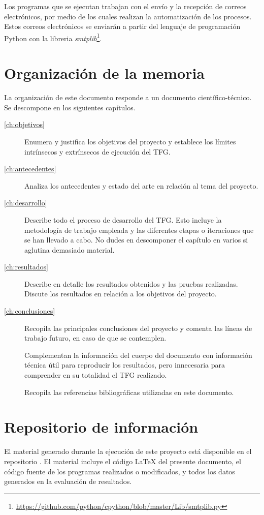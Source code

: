 Los programas que se ejecutan trabajan con el envío y la recepción de correos electrónicos, por medio de los cuales realizan la automatización de los procesos. Estos correos electrónicos se enviarán a partir del lenguaje de programación Python con la libreria \emph{smtplib}\footnote{\url{https://github.com/python/cpython/blob/master/Lib/smtplib.py}}.

\section{Organización de la memoria} 
\label{sec:organizacion-memoria}

\noindent La organización de este documento responde a un documento científico-técnico. Se descompone en los siguientes capítulos.

\begin{description}
    \item[\autoref{ch:objetivos}] Enumera y justifica los objetivos del proyecto y establece los límites intrínsecos y extrínsecos de ejecución del TFG.
    \item[\autoref{ch:antecedentes}] Analiza los antecedentes y estado del arte en relación al tema del proyecto.
    \item[\autoref{ch:desarrollo}] Describe todo el proceso de desarrollo del TFG.  Esto incluye la metodología de trabajo empleada y las diferentes etapas o iteraciones que se han llevado a cabo.  No dudes en descomponer el capítulo en varios si aglutina demasiado material.
    \item[\autoref{ch:resultados}] Describe en detalle los resultados obtenidos y las pruebas realizadas. Discute los resultados en relación a los objetivos del proyecto.
    \item[\autoref{ch:conclusiones}] Recopila las principales conclusiones del proyecto y comenta las líneas de trabajo futuro, en caso de que se contemplen.
    \item[] Complementan la información del cuerpo del documento con información técnica útil para reproducir los resultados, pero innecesaria para comprender en su totalidad el TFG realizado.
    \item[] Recopila las referencias bibliográficas utilizadas en este documento.
\end{description}

\section{Repositorio de información}
\label{sec:repositorio}

\noindent El material generado durante la ejecución de este proyecto está disponible en el repositorio \thegitrepo{}. El material incluye el código \LaTeX{} del presente documento, el código fuente de los programas realizados o modificados, y todos los datos generados en la evaluación de resultados.